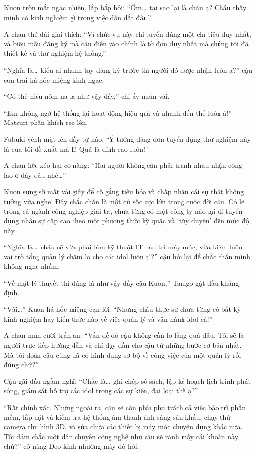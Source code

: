 \documentclass[../main.tex]{subfiles}
\begin{document}
Kuon tròn mắt ngạc nhiên, lắp bắp hỏi: ``Ờm\dots\ tại sao lại là cháu ạ? Cháu thấy mình có kinh nghiệm gì trong việc dẫn dắt đâu.''

A-chan thở dài giải thích: ``Vì chức vụ này chỉ tuyển đúng một chỉ tiêu duy nhất, và biểu mẫu đăng ký mà cậu điền vào chính là tờ đơn duy nhất mà chúng tôi đã thiết kế và thử nghiệm hệ thống.''

``Nghĩa là\dots\ kiểu ai nhanh tay đăng ký trước thì người đó được nhận luôn ạ?'' cậu con trai há hốc miệng kinh ngạc.

``Có thể hiểu nôm na là như vậy đấy,'' chị ấy nhún vai.

``Em không ngờ hệ thống lại hoạt động hiệu quả và nhanh đến thế luôn á!'' Matsuri phấn khích reo lên.

Fubuki vênh mặt lên đầy tự hào: ``Ý tưởng đăng đơn tuyển dụng thử nghiệm này là của tôi đề xuất mà lị! Quá là đỉnh cao luôn!''

A-chan liếc xéo hai cô nàng: ``Hai người không cần phải tranh nhau nhận công lao ở đây đâu nhé\dots''

Kuon sững sờ mất vài giây để cố gắng tiêu hóa và chấp nhận cái sự thật không tưởng vừa nghe. Đây chắc chắn là một cú sốc cực lớn trong cuộc đời cậu. Có lẽ trong cả ngành công nghiệp giải trí, chưa từng có một công ty nào lại đi tuyển dụng nhân sự cấp cao theo một phương thức kỳ quặc và `tùy duyên' đến mức độ này.

``Nghĩa là\dots\ cháu sẽ vừa phải làm kỹ thuật IT bảo trì máy móc, vừa kiêm luôn vai trò tổng quản lý chăm lo cho các idol luôn ạ!?'' cậu hỏi lại để chắc chắn mình không nghe nhầm.

``Về mặt lý thuyết thì đúng là như vậy đấy cậu Kuon,'' Tanigo gật đầu khẳng định.

``Vãi\dots'' Kuon há hốc miệng cạn lời, ``Nhưng cháu thực sự chưa từng có bất kỳ kinh nghiệm hay kiến thức nào về việc quản lý và vận hành idol cả!''

A-chan mỉm cười trấn an: ``Vấn đề đó cậu không cần lo lắng quá đâu. Tôi sẽ là người trực tiếp hướng dẫn và chỉ dạy dần cho cậu từ những bước cơ bản nhất. Mà tôi đoán cậu cũng đã có hình dung sơ bộ về công việc của một quản lý rồi đúng chứ?''

Cậu gãi đầu ngẫm nghĩ: ``Chắc là\dots\ ghi chép sổ sách, lập kế hoạch lịch trình phát sóng, giám sát hỗ trợ các idol trong các sự kiện, đại loại thế ạ?''

``Rất chính xác. Nhưng ngoài ra, cậu sẽ còn phải phụ trách cả việc bảo trì phần mềm, lắp đặt và kiểm tra hệ thống âm thanh ánh sáng sân khấu, chạy thử camera thu hình 3D, và sửa chữa các thiết bị máy móc chuyên dụng khác nữa. Tôi dám chắc một dân chuyên công nghệ như cậu sẽ rành mấy cái khoản này chứ?'' cô nàng Đeo kính nhướng mày dò hỏi.
\end{document}
